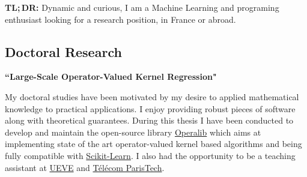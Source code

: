 \documentclass[10pt]{article} %
\begin{document}
\vspace{-1.75cm}
\begin{center}
    \textbf{TL;\,DR:} Dynamic and curious, I am a Machine Learning and
    programing enthusiast looking for a research position, in France or abroad.
\end{center}
\vspace{-3.5mm}
\begin{paracol}{2}
%
%
\section{Doctoral Research}
%
{\raggedright\textbf{``Large-Scale Operator-Valued Kernel
                       Regression"} \\}
My doctoral studies  have been motivated by my desire to applied mathematical
knowledge to practical applications. I enjoy providing robust pieces of
software along with theoretical guarantees. During this thesis I have been
conducted to develop and maintain the open-source library
\href{https://github.com/operalib/operalib}{Operalib} which aims at
implementing state of the art operator-valued kernel based algorithms and being
fully compatible with
\href{http://scikit-learn.org/stable/index.html}{Scikit-Learn}. I also had the
opportunity to be a teaching assistant at
\href{https://www.univ-evry.fr/accueil.html}{UEVE} and
\href{https://www.telecom-paristech.fr/}{T\'el\'ecom ParisTech}.
%
\medskip %
%
%

\end{paracol}
\end{document}
